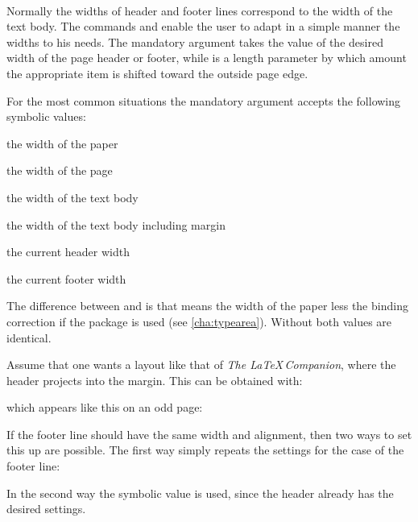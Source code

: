 \begin{Declaration}
\\
\end{Declaration}%
%
%
Normally the widths of header and footer lines correspond to the width of the
text body.  The commands
 and
 enable the user to
adapt in a simple manner the widths to his needs.  The mandatory argument
 takes the value of the desired width of the page header or
footer, while  is a length parameter by which amount the
appropriate item is shifted toward the outside page edge.

For the most common situations the mandatory argument 
accepts the following symbolic values:
\begin{labeling}[\,--]{}
\item[\PValue{paper}] the width of the paper
\item[\PValue{page}] the width of the page
\item[\PValue{text}] the width of the text body
\item[\PValue{textwithmarginpar}] the width of the text body including margin
\item[\PValue{head}] the current header width
\item[\PValue{foot}] the current footer width
\end{labeling}
The difference between  and  is that
 means the width of the paper less the binding correction
if the package  is used (see
\autoref{cha:typearea}). Without  both values are
identical.

\begin{Example}
  Assume that one wants a layout like that of \emph{The
    {\LaTeX}\,Companion}, where the header projects into the
  margin. This can be obtained with:
\begin{lstcode}
\end{lstcode}
%
  which appears like this on an odd page:
%
  \begin{XmpTopPage}
    \thinlines{}
  \end{XmpTopPage}
%
  If the footer line should have the same width and alignment, then two
  ways to set this up are possible. The first way simply repeats the
  settings for the case of the footer line:
\begin{lstcode}
\end{lstcode}
%
  In the second way the symbolic value  is used, since the
  header already has the desired settings.
\begin{lstcode}
\end{lstcode}
\end{Example}

